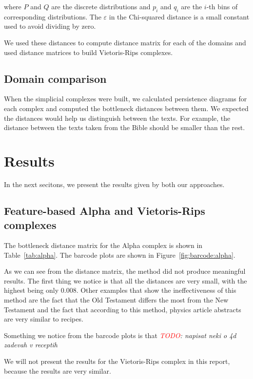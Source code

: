 \documentclass[12pt,a4paper]{amsart}
\begin{document}
\noindent
where $P$ and $Q$ are the discrete distributions and $p_i$ and $q_i$ are the
$i$-th bins of corresponding distributions. The $\varepsilon$ in the Chi-squared
distance is a small constant used to avoid dividing by zero.

We used these distances to compute distance matrix for each of the
domains and used distance matrices to build Vietoris-Rips complexes.

\subsection{Domain comparison}

When the simplicial complexes were built, we calculated persistence diagrams for
each complex and computed the bottleneck distances between them. We expected the
distances would help us distinguish between the texts. For example, the distance
between the texts taken from the Bible should be smaller than the rest.

\section{Results}

In the next secitons, we present the results given by both our approaches.

\subsection{Feature-based Alpha and Vietoris-Rips complexes} The bottleneck
distance matrix for the Alpha complex is shown in Table~\ref{tab:alpha}. The
barcode plots are shown in Figure~\ref{fig:barcode:alpha}.

As we can see from the distance matrix, the method did not produce meaningful
results. The first thing we notice is that all the distances are very small,
with the highest being only $0.008$. Other examples that show the ineffectiveness
of this method are the fact that the Old Testament differs the most from the New
Testament and the fact that according to this method, physics article abstracts
are very similar to recipes.

Something we notice from the barcode plots is that
\emph{\textcolor{red}{TODO}: napisat neki o 4d zadevah v receptih}

We will not present the results for the Vietoris-Rips complex in this report,
because the results are very similar.
\end{document}

